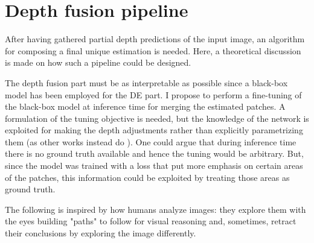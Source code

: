 \section{Depth fusion pipeline}
\label{sec:depth_fusion}
After having gathered partial depth predictions of the input image, an algorithm for composing a final unique estimation is needed.
Here, a theoretical discussion is made on how such a pipeline could be designed.

The depth fusion part must be as interpretable as possible since a black-box model has been employed for the DE part.
I propose to perform a fine-tuning of the black-box model at inference time for merging the estimated patches.
A formulation of the tuning objective is needed, but the knowledge of the network is exploited for making the depth adjustments rather than explicitly parametrizing them (as other works instead do \cite{konrad2, DepthTransfer, 360MonoDepth}).
One could argue that during inference time there is no ground truth available and hence the tuning would be arbitrary.
But, since the model was trained with a loss that put more emphasis on certain areas of the patches, this information could be exploited by treating those areas as ground truth.

The following is inspired by how humans analyze images: they explore them with the eyes building "paths" to follow for visual reasoning and, sometimes, retract their conclusions by exploring the image differently.

\vspace{0.5cm}

